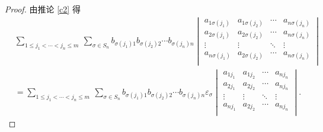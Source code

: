 \documentclass{ctexart}
\begin{document}
\begin{proof}
    由推论 \ref{c2} 得
    \begin{align*}
        & \sum\limits_{1\leq j_1<\cdots<j_n\leq m}\ \sum_{\sigma\in S_n}b_{\sigma(j_1)1}b_{\sigma(j_2)2}\cdots b_{\sigma(j_n)n}\begin{vmatrix}
            a_{1\sigma(j_1)} & a_{1\sigma(j_2)} & \cdots & a_{n\sigma(j_n)} \\
            a_{2\sigma(j_1)} & a_{2\sigma(j_2)} & \cdots & a_{n\sigma(j_n)} \\
            \vdots & \vdots & \ddots & \vdots \\
            a_{n\sigma(j_1)} & a_{2\sigma(j_2)} & \cdots & a_{n\sigma(j_n)} \\
        \end{vmatrix} \\
        & =\sum\limits_{1\leq j_1<\cdots<j_n\leq m}\ \sum_{\sigma\in S_n}b_{\sigma(j_1)1}b_{\sigma(j_2)2}\cdots b_{\sigma(j_n)n}\varepsilon_\sigma\begin{vmatrix}
            a_{1j_1} & a_{1j_2} & \cdots & a_{nj_n} \\
            a_{2j_1} & a_{2j_2} & \cdots & a_{nj_n} \\
            \vdots & \vdots & \ddots & \vdots \\
            a_{nj_1} & a_{2j_2} & \cdots & a_{nj_n} \\
        \end{vmatrix}.
    \end{align*}


\end{proof}
\end{document}
